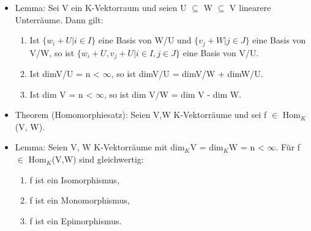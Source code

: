 \begin{itemize}
\item Lemma: Sei V ein K-Vektorraum und seien U $\subseteq$ W $\subseteq$ V linearere Unterräume. Dann gilt:
\begin{enumerate}
\item Ist $\{w_i + U | i \in I\}$ eine Basis von W/U und $\{v_j + W | j \in J\}$ eine Basis von V/W, so ist $\{w_i +U, v_j +U | i \in I, j \in J\}$ eine Basis von V/U.
\item Ist dimV/U = n < $\infty$, so ist dimV/U = dimV/W + dimW/U.
\item Ist dim V = n < $\infty$, so ist dim V/W = dim V - dim W.
\end{enumerate}
\item Theorem (Homomorphiesatz): Seien V,W K-Vektorräume und sei f $\in$ Hom$_K$(V, W).
\item Lemma: Seien V, W K-Vektorräume mit dim$_K$V = dim$_K$W = n < $\infty$. Für f $\in$ Hom$_K$(V,W) sind gleichwertig:
\begin{enumerate}
\item f ist ein Isomorphismus,
\item f ist ein Monomorphismus, 
\item f ist ein Epimorphismus.
\end{enumerate}
\end{itemize}

